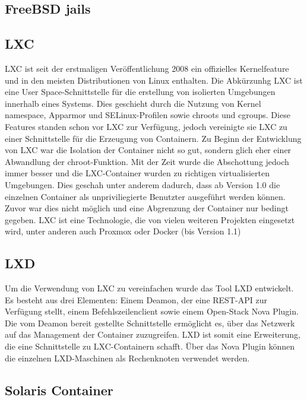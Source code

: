 \subsection{FreeBSD jails}
\label{sec:jails}



\subsection{LXC}
\label{sec:lxc}

LXC ist seit der erstmaligen Veröffentlichung 2008 ein offizielles Kernelfeature und in den meisten Distributionen von Linux enthalten. Die Abkürzunhg LXC ist eine User Space-Schnittstelle für die erstellung von isolierten Umgebungen innerhalb eines Systems. Dies geschieht durch die Nutzung von Kernel namespace, Apparmor und SELinux-Profilen sowie chroots und cgroups. Diese Features standen schon vor LXC zur Verfügung, jedoch vereinigte sie LXC zu einer Schnittstelle für die Erzeugung von Containern. Zu Beginn der Entwicklung von LXC war die Isolation der Container nicht so gut, sondern glich eher einer Abwandlung der chroot-Funktion. Mit der Zeit wurde die Abschottung jedoch immer besser und die LXC-Container wurden zu richtigen virtualisierten Umgebungen. Dies geschah unter anderem dadurch, dass ab Version 1.0 die einzelnen Container als unpriviliegierte Benutzter ausgeführt werden können. Zuvor war dies nicht möglich und eine Abgrenzung der Container nur bedingt gegeben. LXC ist eine Technologie, die von vielen weiteren Projekten eingesetzt wird, unter anderen auch Proxmox oder Docker (bis Version 1.1)\cite{LXCHomepage,IEEE7036275, IEEE7185212, IEEE7571957,IEEE7929714}


\subsection{LXD}
\label{sec:lxd}

Um die Verwendung von LXC zu vereinfachen wurde das Tool LXD entwickelt. Es besteht aus drei Elementen: Einem Deamon, der eine REST-API zur Verfügung stellt, einem Befehlszeilenclient sowie einem Open-Stack Nova Plugin. Die vom Deamon bereit gestellte Schnittstelle ermöglicht es, über das Netzwerk auf das Management der Container zuzugreifen. LXD ist somit eine Erweiterung, die eine Schnittstelle zu LXC-Containern schafft. Über das Nova Plugin können die einzelnen LXD-Maschinen als Rechenknoten verwendet werden. \cite{LXDHomepage}

\subsection{Solaris Container}
\label{sec:solariscontainer}




